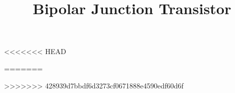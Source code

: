 \documentclass[twoside, final]{hcmut_report}
\title{Bipolar Junction Transistor}
\begin{document}
\coverpage
\pagestyle{empty}
\tableofcontents
\pagestyle{fancy}
\newpage

<<<<<<< HEAD





=======


>>>>>>> 428939d7bbdf6d3273cf0671888e4590edf60d6f
\end{document}
